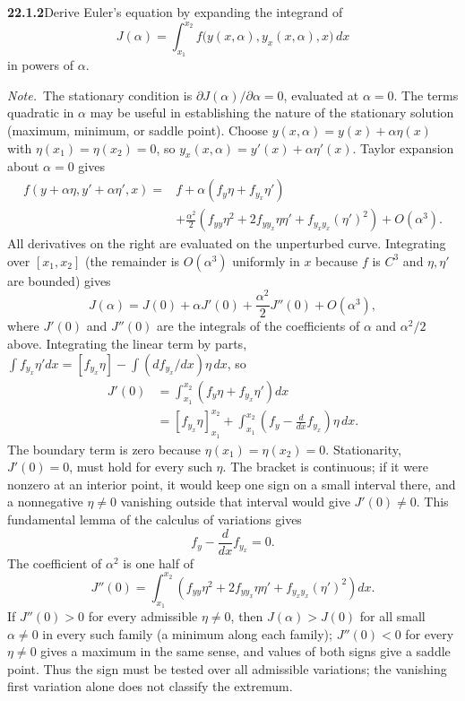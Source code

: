 \par\bigskip
\noindent\textbf{22.1.2}\quad Derive Euler's equation by expanding
the integrand of
\[
J(\alpha)=\int_{x_{1}}^{x_{2}}
f\big(y(x,\alpha),y_{x}(x,\alpha),x\big)\,dx
\]
in powers of $\alpha$.
\par\emph{Note.}~The stationary condition is
$\partial J(\alpha)/\partial\alpha=0$, evaluated at $\alpha=0$.
The terms quadratic in $\alpha$ may be useful in establishing the
nature of the stationary solution (maximum, minimum, or saddle
point).
\solution
Choose $y(x,\alpha)=y(x)+\alpha\eta(x)$ with
$\eta(x_1)=\eta(x_2)=0$, so
$y_x(x,\alpha)=y'(x)+\alpha\eta'(x)$. Taylor expansion about
$\alpha=0$ gives
\[
\begin{aligned}
f(y+\alpha\eta,y'+\alpha\eta',x)
={}&f+\alpha(f_y\eta+f_{y_x}\eta')\\
&+\frac{\alpha^2}{2}
\left(f_{yy}\eta^2+2f_{y y_x}\eta\eta'
+f_{y_xy_x}(\eta')^2\right)+O(\alpha^3).
\end{aligned}
\]
All derivatives on the right are evaluated on the unperturbed curve.
Integrating over $[x_1,x_2]$ (the remainder is $O(\alpha^3)$ uniformly
in $x$ because $f$ is $C^3$ and $\eta,\eta'$ are bounded) gives
\[
J(\alpha)=J(0)+\alpha J'(0)+\frac{\alpha^2}{2}J''(0)+O(\alpha^3),
\]
where $J'(0)$ and $J''(0)$ are the integrals of the coefficients of
$\alpha$ and $\alpha^2/2$ above. Integrating the linear term by parts,
$\int f_{y_x}\eta'dx=[f_{y_x}\eta]-\int(df_{y_x}/dx)\eta\,dx$, so
\[
\begin{aligned}
J'(0)&=\int_{x_1}^{x_2}(f_y\eta+f_{y_x}\eta')dx\\
&=[f_{y_x}\eta]_{x_1}^{x_2}
+\int_{x_1}^{x_2}\left(f_y-\frac d{dx}f_{y_x}\right)\eta\,dx.
\end{aligned}
\]
The boundary term is zero because $\eta(x_1)=\eta(x_2)=0$.
Stationarity, $J'(0)=0$, must hold for every such $\eta$. The bracket
is continuous; if it were nonzero at an interior point, it would keep
one sign on a small interval there, and a nonnegative $\eta\ne0$
vanishing outside that interval would give $J'(0)\ne0$. This
fundamental lemma of the calculus of variations gives
\[
\boxed{f_y-\frac d{dx}f_{y_x}=0}.
\]
The coefficient of $\alpha^2$ is one half of
\[
J''(0)=\int_{x_1}^{x_2}
\left(f_{yy}\eta^2+2f_{y y_x}\eta\eta'
+f_{y_xy_x}(\eta')^2\right)dx.
\]
If $J''(0)>0$ for every admissible $\eta\ne0$, then $J(\alpha)>J(0)$
for all small $\alpha\ne0$ in every such family (a minimum along each
family); $J''(0)<0$ for every $\eta\ne0$ gives a maximum in the same
sense, and values of both signs give a saddle point. Thus the sign must
be tested over all admissible variations; the vanishing first variation
alone does not classify the extremum.


